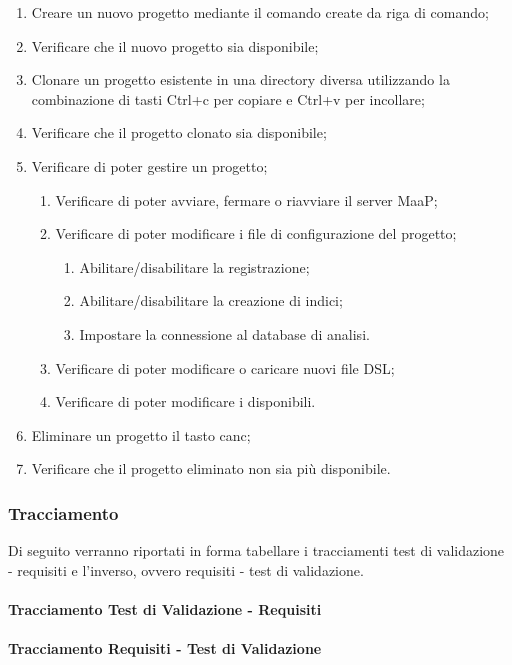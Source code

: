 \begin{enumerate}
\item Creare un nuovo progetto mediante il comando create da riga di comando;
\item Verificare che il nuovo progetto sia disponibile;
\item Clonare un progetto esistente in una directory diversa utilizzando la combinazione di tasti Ctrl+c per copiare e Ctrl+v per incollare;
\item Verificare che il progetto clonato sia disponibile;
\item Verificare di poter gestire un progetto;
\begin{enumerate}
\item Verificare di poter avviare, fermare o riavviare il server MaaP;
\item Verificare di poter modificare i file di configurazione del progetto;
\begin{enumerate}
\item Abilitare/disabilitare la registrazione;
\item Abilitare/disabilitare la creazione di indici;
\item Impostare la connessione al database di analisi.
\end{enumerate}
\item Verificare di poter modificare o caricare nuovi file DSL;
\item Verificare di poter modificare i  disponibili.
\end{enumerate}
\item Eliminare un progetto il tasto canc;
\item Verificare che il progetto eliminato non sia più disponibile.
\end{enumerate}

\subsubsection{Tracciamento}
Di seguito verranno riportati in forma tabellare i tracciamenti test di validazione - requisiti e l'inverso, ovvero requisiti - test di validazione.\\

\paragraph{Tracciamento Test di Validazione - Requisiti}


\paragraph{Tracciamento Requisiti - Test di Validazione}
